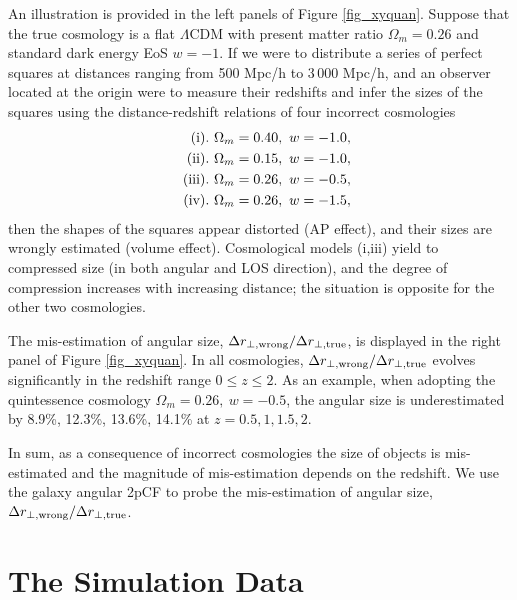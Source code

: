 \documentclass[iop]{emulateapj}
\begin{document}
An illustration is provided in the left panels of Figure \ref{fig_xyquan}.
Suppose that the true cosmology is a flat $\Lambda$CDM with present matter ratio $\Omega_m=0.26$
and standard dark energy EoS $w=-1$.
If we were to distribute a series of perfect squares at distances ranging from 500 Mpc/h to 3\,000 Mpc/h,
and an observer located at the origin were to measure their redshifts and infer the sizes of the squares
using the distance-redshift relations of four incorrect cosmologies
\begin{eqnarray}
 & &{\rm (i)}.\ \Omega_m=0.40,\ w=-1.0, \nonumber \\ 
 & &{\rm (ii)}.\ \Omega_m=0.15,\ w=-1.0, \nonumber\\ \noindent
 & &{\rm (iii)}.\ \Omega_m=0.26,\ w=-0.5,\nonumber\\ \noindent
 & &{\rm (iv)}.\ \Omega_m=0.26,\ w=-1.5,  \nonumber \noindent 
\end{eqnarray}
then the shapes of the squares appear distorted (AP effect),
and their sizes are wrongly estimated (volume effect).
Cosmological models (i,iii) yield to compressed size (in both angular and LOS direction),
and the degree of compression increases with increasing distance;
the situation is opposite for the other two cosmologies.

The mis-estimation of angular size, ${\Delta r_{\perp, \rm wrong}}/{\Delta r_{\perp, \rm true}}$, 
is displayed in the right panel of Figure \ref{fig_xyquan}.
In all cosmologies, ${\Delta r_{\perp, \rm wrong}}/{\Delta r_{\perp, \rm true}}$ evolves significantly in the redshift range $0\leq z\leq 2$.
As an example, when adopting the quintessence cosmology $\Omega_m=0.26,\ w=-0.5$,
the angular size is underestimated by 
8.9\%, 12.3\%, 13.6\%, 14.1\% 
at $z=0.5,1,1.5,2$.


In sum, as a consequence of incorrect cosmologies 
the size of objects is mis-estimated and the magnitude of mis-estimation depends on the redshift.
We use the galaxy angular 2pCF to probe the mis-estimation of angular size, ${\Delta r_{\perp, \rm wrong}}/{\Delta r_{\perp, \rm true}}$.


\section{The Simulation Data}\label{sec:data}
\end{document}
